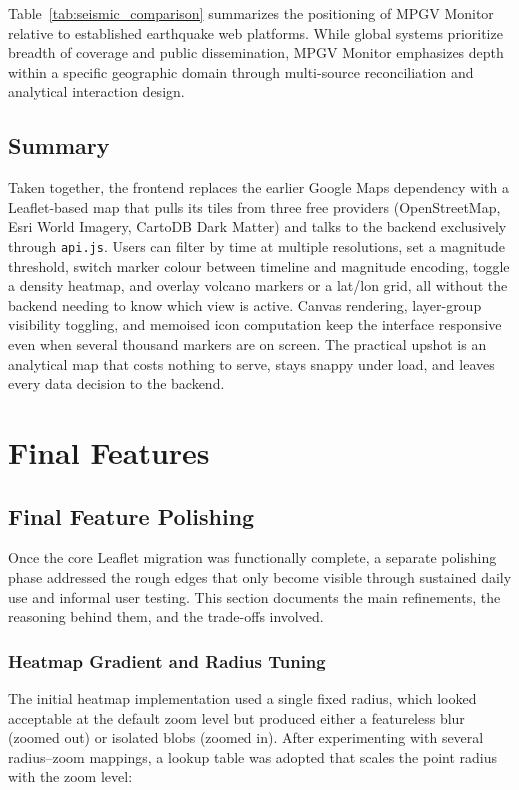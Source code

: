 \documentclass[12pt]{article}
\begin{document}
Table~\ref{tab:seismic_comparison} summarizes the positioning of MPGV Monitor relative to established earthquake web platforms. While global systems prioritize breadth of coverage and public dissemination, MPGV Monitor emphasizes depth within a specific geographic domain through multi-source reconciliation and analytical interaction design.


\subsection{Summary}
\label{subsec:frontend_summary}

Taken together, the frontend replaces the earlier Google Maps dependency with a Leaflet-based map that pulls its tiles from three free providers (OpenStreetMap, Esri World Imagery, CartoDB Dark Matter) and talks to the backend exclusively through \texttt{api.js}. Users can filter by time at multiple resolutions, set a magnitude threshold, switch marker colour between timeline and magnitude encoding, toggle a density heatmap, and overlay volcano markers or a lat/lon grid, all without the backend needing to know which view is active. Canvas rendering, layer-group visibility toggling, and memoised icon computation keep the interface responsive even when several thousand markers are on screen. The practical upshot is an analytical map that costs nothing to serve, stays snappy under load, and leaves every data decision to the backend.


\section{Final Features}
\subsection{Final Feature Polishing}
Once the core Leaflet migration was functionally complete, a separate polishing phase addressed the rough edges that only become visible through sustained daily use and informal user testing. This section documents the main refinements, the reasoning behind them, and the trade-offs involved.

\subsubsection{Heatmap Gradient and Radius Tuning}

The initial heatmap implementation used a single fixed radius, which looked acceptable at the default zoom level but produced either a featureless blur (zoomed out) or isolated blobs (zoomed in). After experimenting with several radius--zoom mappings, a lookup table was adopted that scales the point radius with the zoom level:
\end{document}

